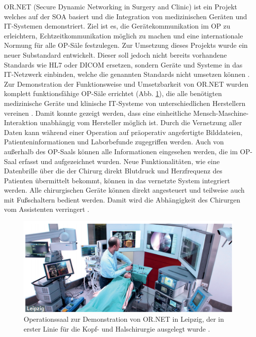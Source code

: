 OR.NET (Secure Dynamic Networking in Surgery and Clinic) ist ein Projekt welches auf der SOA basiert und die Integration von medizinischen Geräten und IT-Systemen demonstriert. Ziel ist es, die Gerätekommunikation im OP zu erleichtern, Echtzeitkommunikation möglich zu machen und eine internationale Normung für alle OP-Säle festzulegen. 
Zur Umsetzung dieses Projekts wurde ein neuer Substandard entwickelt. Dieser soll jedoch nicht bereits vorhandene Standards wie HL7 oder DICOM ersetzen, sondern Geräte und Systeme in das IT-Netzwerk einbinden, welche die genannten Standards nicht umsetzen können \cite{ORnetWebsite}.\\
Zur Demonstration der Funktionsweise und Umsetzbarkeit von OR.NET wurden komplett funktionsfähige OP-Säle errichtet (Abb. \ref{fig:ornet}), die alle benötigten medizinische Geräte und klinische IT-Systeme von unterschiedlichen Herstellern vereinen \cite{ORnet}. Damit konnte gezeigt werden, dass eine einheitliche Mensch-Maschine-Interaktion unabhängig vom Hersteller möglich ist. Durch die Vernetzung aller Daten kann während einer Operation auf präoperativ angefertigte Bilddateien, Patienteninformationen und Laborbefunde zugegriffen werden. Auch von außerhalb des OP-Saals können alle Informationen eingesehen werden, die im OP-Saal erfasst und aufgezeichnet wurden. Neue Funktionalitäten, wie eine Datenbrille über die der Chirurg direkt Blutdruck und Herzfrequenz des Patienten übermittelt bekommt, können in das vernetzte System integriert werden. Alle chirurgischen Geräte können direkt angesteuert und teilweise auch mit Fußschaltern bedient werden. Damit wird die Abhängigkeit des Chirurgen vom Assistenten verringert \cite{ORnetWebsite}.

\begin{figure} [H]
	\includegraphics[scale = 0.8]{Content/Pictures/ornet.png}
	\caption{Operationssaal zur Demonstration von OR.NET in Leipzig, der in erster Linie für die Kopf- und Halschirurgie ausgelegt wurde \cite{ORnetWebsite}.}
	\label{fig:ornet}
\end{figure}

